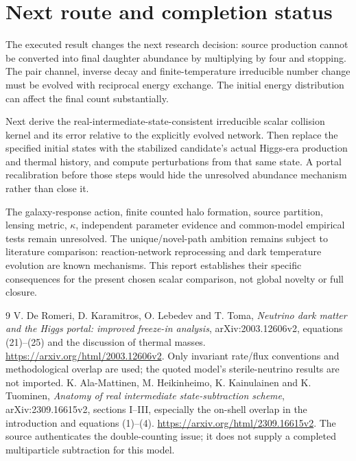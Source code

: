 \documentclass[11pt]{article}
\begin{document}
\section{Next route and completion status}
The executed result changes the next research decision: source production
cannot be converted into final daughter abundance by multiplying by four
and stopping. The pair channel, inverse decay and finite-temperature
irreducible number change must be evolved with reciprocal energy exchange.
The initial energy distribution can affect the final count substantially.

Next derive the real-intermediate-state-consistent irreducible scalar
collision kernel and its error relative to the explicitly evolved network.
Then replace the specified initial states with the stabilized candidate's
actual Higgs-era production and thermal history, and compute perturbations
from that same state. A portal recalibration before those steps would hide
the unresolved abundance mechanism rather than close it.

The galaxy-response action, finite counted halo formation, source partition,
lensing metric, $\kappa$, independent parameter evidence and common-model
empirical tests remain unresolved. The unique/novel-path ambition remains
subject to literature comparison: reaction-network reprocessing and dark
temperature evolution are known mechanisms. This report establishes their
specific consequences for the present chosen scalar comparison, not global
novelty or full closure.

\begin{thebibliography}{9}
 V. De Romeri, D. Karamitros, O. Lebedev and T. Toma,
\emph{Neutrino dark matter and the Higgs portal: improved freeze-in analysis},
arXiv:2003.12606v2, equations (21)--(25) and the discussion of thermal masses.
\url{https://arxiv.org/html/2003.12606v2}.
Only invariant rate/flux conventions and methodological overlap are used;
the quoted model's sterile-neutrino results are not imported.
 K. Ala-Mattinen, M. Heikinheimo, K. Kainulainen and K. Tuominen,
\emph{Anatomy of real intermediate state-subtraction scheme},
arXiv:2309.16615v2, sections I--III, especially the on-shell overlap in
the introduction and equations (1)--(4).
\url{https://arxiv.org/html/2309.16615v2}.
The source authenticates the double-counting issue; it does not supply a
completed multiparticle subtraction for this model.
\end{thebibliography}
\end{document}

